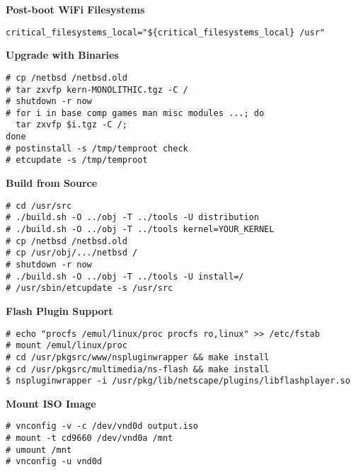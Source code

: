 \documentclass[10pt]{article}
\begin{document}
\begin{multicols}{2}
\textbf{\color{blueheader}Post-boot WiFi Filesystems}
\begin{lstlisting}
critical_filesystems_local="${critical_filesystems_local} /usr"
\end{lstlisting}

\textbf{\color{blueheader}Upgrade with Binaries}
\begin{lstlisting}
# cp /netbsd /netbsd.old
# tar zxvfp kern-MONOLITHIC.tgz -C /
# shutdown -r now
# for i in base comp games man misc modules ...; do 
  tar zxvfp $i.tgz -C /; 
done
# postinstall -s /tmp/temproot check
# etcupdate -s /tmp/temproot
\end{lstlisting}

\textbf{\color{blueheader}Build from Source}
\begin{lstlisting}
# cd /usr/src
# ./build.sh -O ../obj -T ../tools -U distribution
# ./build.sh -O ../obj -T ../tools kernel=YOUR_KERNEL
# cp /netbsd /netbsd.old
# cp /usr/obj/.../netbsd /
# shutdown -r now
# ./build.sh -O ../obj -T ../tools -U install=/
# /usr/sbin/etcupdate -s /usr/src
\end{lstlisting}

\textbf{\color{blueheader}Flash Plugin Support}
\begin{lstlisting}
# echo "procfs /emul/linux/proc procfs ro,linux" >> /etc/fstab
# mount /emul/linux/proc
# cd /usr/pkgsrc/www/nspluginwrapper && make install
# cd /usr/pkgsrc/multimedia/ns-flash && make install
$ nspluginwrapper -i /usr/pkg/lib/netscape/plugins/libflashplayer.so
\end{lstlisting}

\textbf{\color{blueheader}Mount ISO Image}
\begin{lstlisting}
# vnconfig -v -c /dev/vnd0d output.iso
# mount -t cd9660 /dev/vnd0a /mnt
# umount /mnt
# vnconfig -u vnd0d
\end{lstlisting}

\end{multicols}
\end{document}
